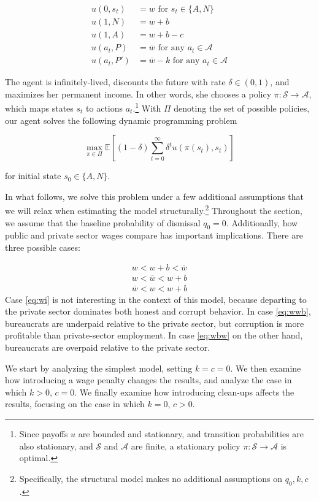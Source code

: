 \documentclass[12pt,a4paper]{article}
\theoremstyle{definition}
\newcommand{\wb}{\overline{w}}
\newcommand{\de}{\delta}
\newcommand{\St}{\mathcal{S}}
\newcommand{\A}{\mathcal{A}}
\begin{document}
{\begin{align*}
    u(0, s_t) &= w \text{ for } s_t \in \{A,N\} \\
    u(1, N) &= w + b\\
    u(1, A) &= w + b - c\\ 
    u(a_t, P) &= \wb \text{ for any } a_t \in \A \\
    u(a_t, P') &= \wb - k \text{ for any } a_t \in \A
\end{align*}

The agent is infinitely-lived, discounts the future with rate $\de \in (0,1)$, and maximizes her permanent income. In other words, she chooses a policy $\pi : \St \rightarrow \A$, which maps states $s_t$ to actions $a_t$.\footnote{Since payoffs $u$ are bounded and stationary, and transition probabilities are also stationary, and $\St$ and $\A$ are finite, a stationary policy $\pi : \St \rightarrow \A$ is optimal.} With $\Pi$ denoting the set of possible policies, our agent solves the following dynamic programming problem 

$$
\max_{\pi \in \Pi} \mathbb{E} \left[ (1-\de) \sum_{t = 0}^\infty \delta^t u(\pi(s_t), s_t) \right] 
$$

for initial state $s_0 \in \{A,N\}$. 

In what follows, we solve this problem under a few additional assumptions that we will relax when estimating the model structurally.\footnote{Specifically, the structural model makes no additional assumptions on $q_0, k, c$.} Throughout the section, we assume that the baseline probability of dismissal $q_0 = 0$. Additionally, how public and private sector wages compare has important implications. There are three possible cases:

\begin{align}
    w < w+b < \wb \label{eq:wi} \\ 
    w < \wb < w+b \label{eq:wwb} \\
    \wb < w < w+b \label{eq:wbw}
\end{align}
Case \ref{eq:wi} is not interesting in the context of this model, because departing to the private sector dominates both honest and corrupt behavior. In case \ref{eq:wwb}, bureaucrats are underpaid relative to the private sector, but corruption is more profitable than private-sector employment. In case \ref{eq:wbw} on the other hand, bureaucrats are overpaid relative to the private sector. 

We start by analyzing the simplest model, setting $k = c = 0$. We then examine how introducing a wage penalty changes the results, and analyze the case in which $k > 0$, $c = 0$. We finally examine how introducing clean-ups affects the results, focusing on the case in which $k = 0$, $c > 0$. 

}
\end{document}
